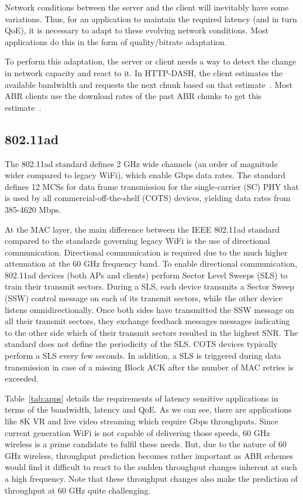 \documentclass[sigconf,anonymous]{acmart}
\begin{document}
Network conditions between the server and the client will inevitably have some variations. Thus, for an application to maintain the required latency (and in turn QoE), it is necessary to adapt to these evolving network conditions. Most applications do this in the form of quality/bitrate adaptation.

To perform this adaptation, the server or client needs a way to detect the change in network capacity and react to it. In HTTP-DASH, the client estimates the available bandwidth and requests the next chunk based on that estimate~\cite{stockhammer:mmsys2011}. Most ABR clients use the download rates of the past ABR chunks to get this estimate~\cite{bentaleb:cst2019}.

\subsection{802.11ad}

The 802.11ad standard defines 2 GHz wide channels (an order of magnitude wider compared to legacy WiFi), which enable Gbps data rates. The standard defines 12 MCSs for data frame transmission for the single-carrier (SC) PHY that is used by all commercial-off-the-shelf (COTS) devices, yielding data rates from 385-4620 Mbps. 

At the MAC layer, the main difference between the IEEE 802.11ad standard compared to the standards governing legacy WiFi is the use of directional communication. Directional communication is required due to the much higher attenuation at the 60 GHz frequency band. To enable directional communication, 802.11ad devices (both APs and clients) perform Sector Level Sweeps (SLS) to train their transmit sectors. During a SLS, each device transmits a Sector Sweep (SSW) control message on each of its transmit sectors, while the other device listens omnidirectionally. Once both sides have transmitted the SSW message on all their transmit sectors, they exchange feedback messages messages indicating to the other side which of their transmit sectors resulted in the highest SNR. The standard does not define the periodicity of the SLS. COTS devices typically perform a SLS every few seconds. In addition, a SLS is triggered during data transmission in case of a missing Block ACK after the number of MAC retries is exceeded.

Table~\ref{tab:apps} details the requirements of latency sensitive applications in terms of the bandwidth, latency and QoE. As we can see, there are applications like 8K VR and live video streaming which require Gbps throughputs. Since current generation WiFi is not capable of delivering those speeds, 60 GHz wireless is a prime candidate to fulfil these needs. But, due to the nature of 60 GHz wireless, throughput prediction becomes rather important as ABR schemes would find it difficult to react to the sudden throughput changes inherent at such a high frequency. Note that these throughput changes also make the prediction of throughput at 60 GHz quite challenging.
\end{document}
